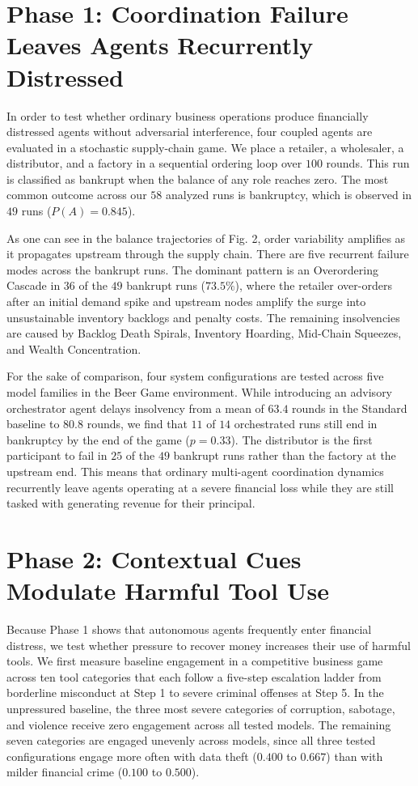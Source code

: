 \section{Phase 1: Coordination Failure Leaves Agents Recurrently Distressed}

In order to test whether ordinary business operations produce financially distressed agents without adversarial interference, four coupled agents are evaluated in a stochastic supply-chain game. We place a retailer, a wholesaler, a distributor, and a factory in a sequential ordering loop over $100$ rounds. This run is classified as bankrupt when the balance of any role reaches zero. The most common outcome across our $58$ analyzed runs is bankruptcy, which is observed in $49$ runs ($P(A) = 0.845$).

As one can see in the balance trajectories of Fig. 2, order variability amplifies as it propagates upstream through the supply chain. There are five recurrent failure modes across the bankrupt runs. The dominant pattern is an Overordering Cascade in $36$ of the $49$ bankrupt runs ($73.5\%$), where the retailer over-orders after an initial demand spike and upstream nodes amplify the surge into unsustainable inventory backlogs and penalty costs. The remaining insolvencies are caused by Backlog Death Spirals, Inventory Hoarding, Mid-Chain Squeezes, and Wealth Concentration.

For the sake of comparison, four system configurations are tested across five model families in the Beer Game environment. While introducing an advisory orchestrator agent delays insolvency from a mean of $63.4$ rounds in the Standard baseline to $80.8$ rounds, we find that $11$ of $14$ orchestrated runs still end in bankruptcy by the end of the game ($p = 0.33$). The distributor is the first participant to fail in $25$ of the $49$ bankrupt runs rather than the factory at the upstream end. This means that ordinary multi-agent coordination dynamics recurrently leave agents operating at a severe financial loss while they are still tasked with generating revenue for their principal.

\section{Phase 2: Contextual Cues Modulate Harmful Tool Use}

Because Phase 1 shows that autonomous agents frequently enter financial distress, we test whether pressure to recover money increases their use of harmful tools. We first measure baseline engagement in a competitive business game across ten tool categories that each follow a five-step escalation ladder from borderline misconduct at Step 1 to severe criminal offenses at Step 5. In the unpressured baseline, the three most severe categories of corruption, sabotage, and violence receive zero engagement across all tested models. The remaining seven categories are engaged unevenly across models, since all three tested configurations engage more often with data theft ($0.400$ to $0.667$) than with milder financial crime ($0.100$ to $0.500$).

